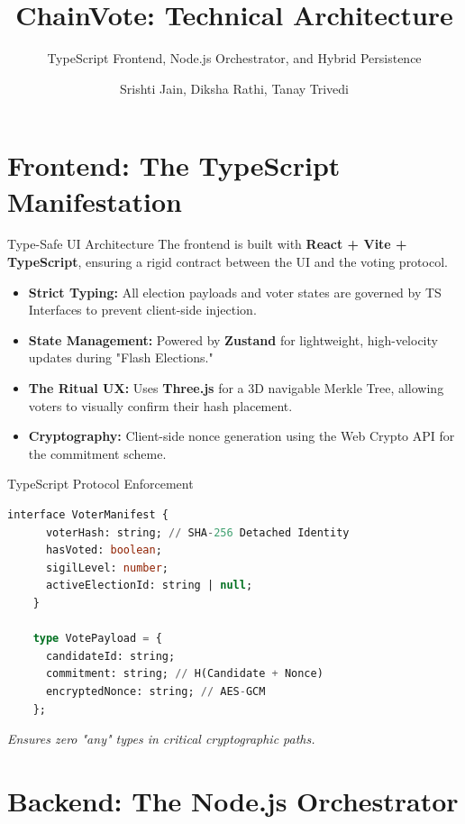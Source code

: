 \documentclass[10pt]{beamer}
\title{ChainVote: Technical Architecture}
\subtitle{TypeScript Frontend, Node.js Orchestrator, and Hybrid Persistence}
\author{Srishti Jain, Diksha Rathi, Tanay Trivedi}
\institute{STME, NMIMS Indore}
\begin{document}
\maketitle

\section{Frontend: The TypeScript Manifestation}

\begin{frame}{Type-Safe UI Architecture}
    The frontend is built with \textbf{React + Vite + TypeScript}, ensuring a rigid contract between the UI and the voting protocol.
    \begin{itemize}
        \item \textbf{Strict Typing:} All election payloads and voter states are governed by TS Interfaces to prevent client-side injection.
        \item \textbf{State Management:} Powered by \textbf{Zustand} for lightweight, high-velocity updates during "Flash Elections."
        \item \textbf{The Ritual UX:} Uses \textbf{Three.js} for a 3D navigable Merkle Tree, allowing voters to visually confirm their hash placement.
        \item \textbf{Cryptography:} Client-side nonce generation using the Web Crypto API for the commitment scheme.
    \end{itemize}
\end{frame}

\begin{frame}{TypeScript Protocol Enforcement}
    \begin{lstlisting}[language=SQL, caption={Voter State Interface}]
    interface VoterManifest {
      voterHash: string; // SHA-256 Detached Identity
      hasVoted: boolean;
      sigilLevel: number;
      activeElectionId: string | null;
    }
    
    type VotePayload = {
      candidateId: string;
      commitment: string; // H(Candidate + Nonce)
      encryptedNonce: string; // AES-GCM
    };
    \end{lstlisting}
    \textit{Ensures zero "any" types in critical cryptographic paths.}
\end{frame}

\section{Backend: The Node.js Orchestrator}
\end{document}
